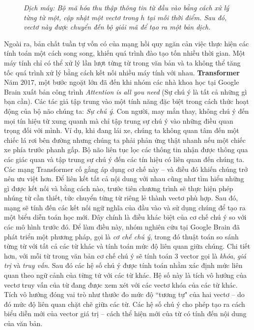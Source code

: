 \begin{multicols}{2}
\begin{figure}[H]
		\caption{\small\textit{\color{timhieukhoahoc}Dịch máy: Bộ mã hóa thu thập thông tin từ đầu vào bằng cách xử lý từng từ một, cập nhật một vectơ trong $h$ tại mỗi thời điểm. Sau đó, vectơ này được chuyển đến bộ giải mã để tạo ra một bản dịch.}}
		\vspace*{-5pt}
	\end{figure}
	Ngoài ra, bản chất tuần tự vốn có của mạng hồi quy ngăn cản việc thực hiện các tính toán một cách song song, khiến quá trình đào tạo tốn nhiều thời gian. Một máy tính chỉ có thể xử lý lần lượt từng từ trong văn bản và ta không thể tăng tốc quá trình xử lý bằng cách kết nối nhiều máy tính với nhau. 
	\vskip 0.1cm
	\textbf{\color{timhieukhoahoc}Transformer}
	\vskip 0.1cm
	Năm $2017$, một bước ngoặt lớn đã đến khi nhóm các nhà khoa học tại Google Brain xuất bản công trình \textit{Attention is all you need} (Sự chú ý là tất cả những gì bạn cần). Các tác giả tập trung vào một tính năng đặc biệt trong cách thức hoạt động của bộ não chúng ta: \textit{Sự chú ý}. Con người, may mắn thay, không chú ý đến mọi tín hiệu từ xung quanh mà chỉ tập trung sự chú ý vào những điều quan trọng đối với mình. Ví dụ, khi đang lái xe, chúng ta không quan tâm đến một chiếc lá rơi bên đường nhưng chúng ta phải phản ứng thật nhanh nếu một chiếc xe phía trước phanh gấp. Bộ não liên tục lọc các thông tin nhận được thông qua các giác quan và tập trung sự chú ý đến các tín hiệu có liên quan đến chúng ta. Các mạng Transformer cố gắng áp dụng cơ chế này -- và điều đó khiến chúng trở nên ưu việt hơn.
	\vskip 0.1cm
	Để liên kết tất cả nội dung với nhau cũng như tìm hiểu những gì được kết nối và bằng cách nào, trước tiên chương trình sẽ thực hiện phép nhúng từ cần thiết, tức chuyển từng từ riêng lẻ thành vectơ phù hợp. Sau đó, mạng sẽ tính đến các kết nối ngữ nghĩa của đầu vào và sử dụng chúng để tạo ra một biểu diễn toán học mới. Đây chính là điều khác biệt của cơ chế chú ý so với các mô hình trước đó. Để làm điều này, nhóm nghiên cứu tại Google Brain đã phát triển một phương pháp, gọi là \textit{cơ chế chú ý}, trong đó thuật toán so sánh từng từ với tất cả các từ khác và tính toán mức độ liên quan giữa chúng. 
	\vskip 0.1cm
	Chi tiết hơn, với mỗi từ trong văn bản cơ chế chú ý sẽ tính toán $3$ vector gọi là \textit{khóa}, \textit{giá trị} và \textit{truy vấn}. Sau đó các hệ số chú ý được tính toán nhằm xác định mức liên quan theo ngữ cảnh của từng tứ với các từ khác. Hệ số này là tích vô hướng của vectơ truy vấn của từ đang được xem xét với các vectơ khóa của các từ khác. Tích vô hướng đóng vai trò như thước đo mức độ ``tương tự" của hai vectơ -- do đó mức độ liên quan chặt chẽ giữa các từ. Các hệ số chú ý cho phép tạo ra cách biểu diễn mới của vector giá trị -- cách thể hiện mới của từ có tính đến nội dung của văn bản.

\end{multicols}
